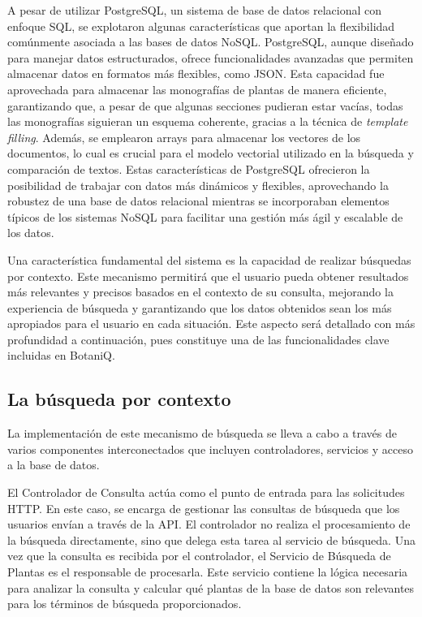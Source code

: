 A pesar de utilizar PostgreSQL, un sistema de base de datos relacional con enfoque SQL, se explotaron algunas 
características que aportan la flexibilidad comúnmente asociada a las bases de datos NoSQL. PostgreSQL, 
aunque diseñado para manejar datos estructurados, ofrece funcionalidades avanzadas que permiten almacenar datos 
en formatos más flexibles, como JSON. Esta capacidad fue aprovechada para almacenar las monografías de plantas 
de manera eficiente, garantizando que, a pesar de que algunas secciones pudieran estar vacías, todas las monografías 
siguieran un esquema coherente, gracias a la técnica de \textit{template filling}. Además, se emplearon arrays 
para almacenar los vectores de los documentos, lo cual es crucial para el modelo vectorial utilizado en la búsqueda y 
comparación de textos. Estas características de PostgreSQL ofrecieron la posibilidad de trabajar con datos más 
dinámicos y flexibles, aprovechando la robustez de una base de datos relacional mientras se incorporaban elementos 
típicos de los sistemas NoSQL para facilitar una gestión más ágil y escalable de los datos.

Una característica fundamental del sistema es la capacidad de realizar búsquedas por contexto. Este mecanismo permitirá 
que el usuario pueda obtener resultados más relevantes y precisos basados en el contexto de su consulta, mejorando 
la experiencia de búsqueda y garantizando que los datos obtenidos sean los más apropiados para el usuario en cada situación. 
Este aspecto será detallado con más profundidad a continuación, pues constituye una de las funcionalidades clave incluidas en BotaniQ.


\subsection{La búsqueda por contexto}
La implementación de este mecanismo de búsqueda se lleva a cabo a través de varios componentes interconectados que incluyen controladores, 
servicios y acceso a la base de datos.

El Controlador de Consulta actúa como el punto de entrada para las solicitudes HTTP. En este caso, se encarga de gestionar las consultas de 
búsqueda que los usuarios envían a través de la API. El controlador no realiza el procesamiento de la búsqueda directamente, sino que delega 
esta tarea al servicio de búsqueda. Una vez que la consulta es recibida por el controlador, el Servicio de Búsqueda de Plantas es el responsable 
de procesarla. Este servicio contiene la lógica necesaria para analizar la consulta y calcular qué plantas de la base de datos son relevantes 
para los términos de búsqueda proporcionados.

